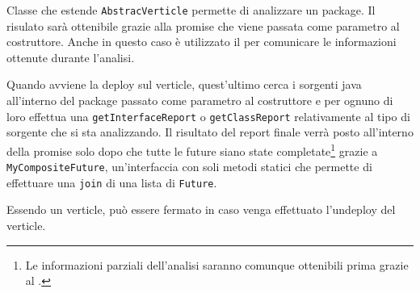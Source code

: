 Classe che estende \texttt{AbstracVerticle} permette di analizzare un package. Il risulato sarà ottenibile grazie alla promise che viene passata come parametro al costruttore. Anche in questo caso è utilizzato il  per comunicare le informazioni ottenute durante l'analisi.

Quando avviene la deploy sul verticle, quest'ultimo cerca i sorgenti java all'interno del package passato come parametro al costruttore e per ognuno di loro effettua una \texttt{getInterfaceReport} o \texttt{getClassReport} relativamente al tipo di sorgente che si sta analizzando.
\newline
Il risultato del report finale verrà posto all'interno della promise solo dopo che tutte le future siano state completate\footnote{Le informazioni parziali dell'analisi saranno comunque ottenibili prima grazie al .} grazie a \texttt{MyCompositeFuture}, un'interfaccia con soli metodi statici che permette di effettuare una \texttt{join} di una lista di \texttt{Future}.

Essendo un verticle,  può essere fermato in caso venga effettuato l'undeploy del verticle.

